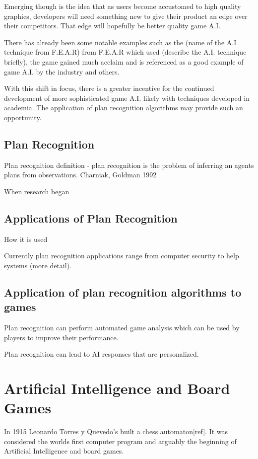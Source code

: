 \documentclass[parskip]{cs4rep}
\begin{document}
Emerging though is the idea that as users become accustomed to high quality graphics, developers will need something new to give their product an edge over their competitors. That edge will hopefully be better quality game A.I.

There has already been some notable examples such as the (name of the A.I technique from F.E.A.R) from F.E.A.R which used (describe the A.I. technique briefly), the game gained much acclaim and is referenced as a good example of game A.I. by the industry and others.

With this shift in focus, there is a greater incentive for the continued development of more sophisticated game A.I. likely with techniques developed in academia. The application of plan recognition algorithms may provide such an opportunity. 

\subsection{Plan Recognition}

Plan recognition definition - plan recognition is the problem of inferring an agents plans from observations. Charniak, Goldman 1992

When research began

\subsection{Applications of Plan Recognition}

How it is used

Currently plan recognition applications range from computer security to help systems (more detail).

\subsection{Application of plan recognition algorithms to games}

Plan recognition can perform automated game analysis which can be used by players to improve their performance. 

Plan recognition can lead to AI responses that are personalized.

\section{Artificial Intelligence and Board Games}

In 1915 Leonardo Torres y Quevedo's built a chess automaton[ref]. It was considered the worlds first computer program and arguably the beginning of Artificial Intelligence and board games.
\end{document}
